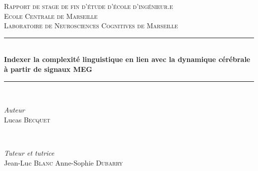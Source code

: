 \documentclass[12pt]{report}
\begin{document}

\begin{titlepage} %
	\newcommand{\HRule}{\rule{\linewidth}{0.5mm}} %
	
	\center %
	
	
	\textsc{\LARGE Rapport de stage de fin d'étude d'école d'ingénieur.e}\\[1.5cm] %
	
	\textsc{\Large Ecole Centrale de Marseille}\\[0.5cm] %
	
	\textsc{\large Laboratoire de Neurosciences Cognitives de Marseille}\\[0.5cm] %
	
	
	\HRule\\[0.4cm]
	
	{\huge\bfseries Indexer la complexité linguistique en lien avec la dynamique cérébrale à partir de signaux MEG}\\[0.4cm] %
	
	\HRule\\[1.5cm]
	
	
	\begin{minipage}{0.4\textwidth}
		\begin{flushleft}
			\large
			\textit{Auteur}\\
			Lucas \textsc{Becquet} %
		\end{flushleft}
	\end{minipage}
	~
	\begin{minipage}{0.4\textwidth}
		\begin{flushright}
			\large
			\textit{Tuteur et tutrice}\\
			Jean-Luc \textsc{Blanc} \newline
			Anne-Sophie \textsc{Dubarry}%
		\end{flushright}
	\end{minipage}
	

\end{titlepage}
\end{document}
